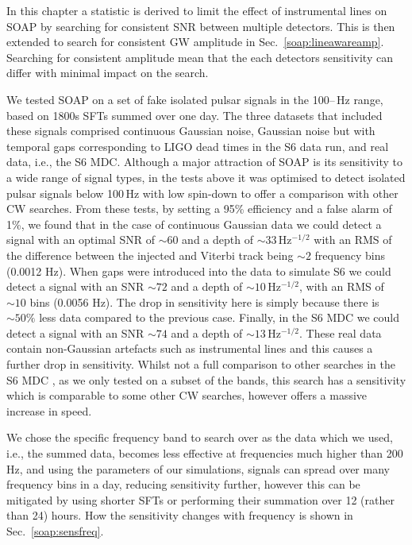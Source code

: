 
In this chapter a statistic is derived to limit the effect of instrumental lines on SOAP by searching for consistent \gls{SNR} between multiple detectors.
This is then extended to search for consistent \gls{GW} amplitude in Sec.~\ref{soap:lineawareamp}.
Searching for consistent amplitude mean that the each detectors sensitivity can differ with minimal impact on the search.

%
%
We tested SOAP on a set of fake isolated pulsar signals in the
100\;--\,Hz range, based on 1800s \glspl{SFT} summed over one day.
The three datasets that included these signals comprised continuous Gaussian noise, Gaussian noise but with temporal gaps corresponding to \gls{LIGO} dead times in the S6 data run, and real data, i.e., the
S6 \gls{MDC}. Although a major attraction of SOAP is its sensitivity to a wide
range of signal types, in the tests above it was optimised to detect isolated pulsar signals below 100\,Hz with low spin-down to offer a comparison with other \gls{CW} searches. From these tests, by setting a
95\% efficiency and a false alarm of 1\%, we found that in the case of  continuous Gaussian data we could detect a signal with an optimal \gls{SNR} of $\sim 60$ and a
depth of $\sim 33$\,Hz$^{-1/2}$ with an \gls{RMS} of the difference between the injected and Viterbi track being $\sim 2$ frequency bins (0.0012 Hz).
When gaps were introduced into the data to simulate S6 we could detect a signal with an
\gls{SNR} $\sim 72$  and a depth of $\sim 10$\,Hz$^{-1/2}$, with an \gls{RMS} of $\sim 10$ bins (0.0056 Hz). The drop in sensitivity here is simply because  there is $\sim 50 \%$ less data compared to the previous case. Finally, in the S6 \gls{MDC} we could
detect a signal with an \gls{SNR} $\sim 74$ and a depth of $\sim
13$\,Hz$^{-1/2}$.
These real data contain non-Gaussian artefacts such as instrumental lines and this causes a further drop in sensitivity.
Whilst not a full comparison to other searches in the S6 \gls{MDC} \citep{walsh2016ComparisonMethods}, as we only tested on a subset
of the bands, this search has a sensitivity which is comparable to some other \gls{CW} searches, however offers a massive increase in speed.

We chose the specific frequency band to search over as the data which we used, i.e., the summed data, becomes less effective at frequencies much higher than 200\,Hz, and using the parameters of our simulations, signals can spread over many frequency bins in a day, reducing sensitivity further, however this can be mitigated by using shorter \glspl{SFT} or performing their summation over 12 (rather than 24) hours.
How the sensitivity changes with frequency is shown in Sec.~\ref{soap:sensfreq}. 

